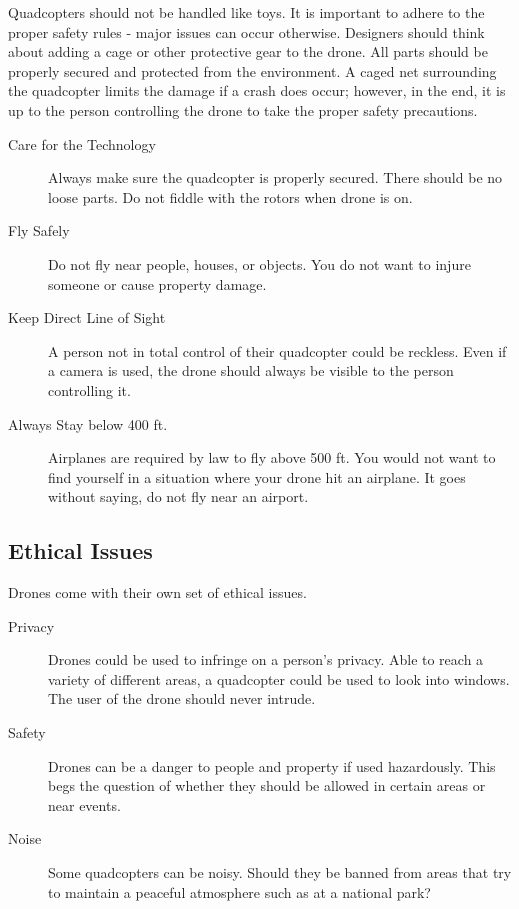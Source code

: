 \documentclass[a4paper, 11pt]{article} %
\begin{document}
Quadcopters should not be handled like toys. It is important to adhere to the proper safety rules - major issues can occur otherwise. Designers should think about adding a cage or other protective gear to the drone. All parts should be properly secured and protected from the environment. A caged net surrounding the quadcopter limits the damage if a crash does occur; however, in the end, it is up to the person controlling the drone to take the proper safety precautions. \cite{Safety}

\begin{description}
\item [Care for the Technology] Always make sure the quadcopter is properly secured. There should be no loose parts. Do not fiddle with the rotors when drone is on. \cite{Safety}
\item [Fly Safely] Do not fly near people, houses, or objects. You do not want to injure someone or cause property damage. \cite{Safety}
\item [Keep Direct Line of Sight] A person not in total control of their quadcopter could be reckless. Even if a camera is used, the drone should always be visible to the person controlling it. \cite{Safety}
\item [Always Stay below 400 ft.] 
Airplanes are required by law to fly above 500 ft. You would not want to find yourself in a situation where your drone hit an airplane. It goes without saying, do not fly near an airport. \cite{Safety}
\end{description}

\subsection{Ethical Issues}

Drones come with their own set of ethical issues.

\begin{description}

\item [Privacy] Drones could be used to infringe on a person's privacy. Able to reach a variety of different areas, a quadcopter could be used to look into windows. The user of the drone should never intrude. \cite{Safety}

\item [Safety] Drones can be a danger to people and property if used hazardously. This begs the question of whether they should be allowed in certain areas or near events. \cite{Safety}

\item [Noise] Some quadcopters can be noisy. Should they be banned from areas that try to maintain a peaceful atmosphere such as at a national park? \cite{Safety}

\end{description}
\end{document}
